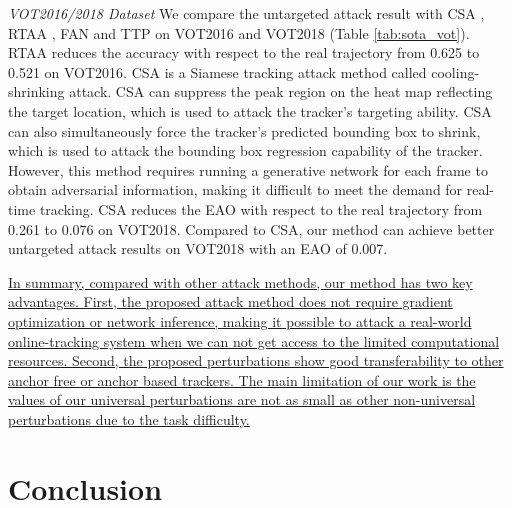 \documentclass[journal]{IEEEtran}
\begin{document}
\textit{VOT2016/2018 Dataset} We compare the untargeted attack result with CSA \cite{CSA}, RTAA \cite{RTAA}, FAN \cite{FAN} and TTP \cite{TTP} on VOT2016 and VOT2018 (Table \ref{tab:sota_vot}). 
RTAA reduces the accuracy with respect to the real trajectory from 0.625 to 0.521 on VOT2016.
CSA \cite{CSA} is a Siamese tracking attack method called cooling-shrinking attack. CSA can suppress the peak region on the heat map reflecting the target location, which is used to attack the tracker's targeting ability. CSA can also simultaneously force the tracker's predicted bounding box to shrink, which is used to attack the bounding box regression capability of the tracker. However, this method requires running a generative network for each frame to obtain adversarial information, making it difficult to meet the demand for real-time tracking. CSA reduces the EAO with respect to the real trajectory from 0.261 to 0.076 on VOT2018. Compared to CSA, our method can achieve better untargeted attack results on VOT2018 with an EAO of 0.007.

\uline{In summary, compared with other attack methods, our method has two key advantages. First, the proposed attack method does not require gradient optimization or network inference, making it possible to attack a real-world online-tracking system when we can not get access to the limited computational resources. Second, the proposed perturbations show good transferability to other anchor free or anchor based trackers. The main limitation of our work is the values of our universal perturbations are not as small as other non-universal perturbations due to the task difficulty.}

\section{Conclusion}
\end{document}
